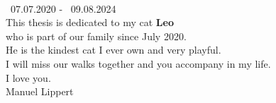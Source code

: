 \NewPage
\thispagestyle{empty}

\begin{center}
    \vspace*{3cm}
    \vspace{2cm}\\
    \gtrsymBorn~07.07.2020 - \gtrsymDied~09.08.2024 \\
    \bigskip
    This thesis is dedicated to my cat \textbf{Leo}\\ who is part of our family since July 2020.\\ He is the kindest cat I ever own and very playful.\\I will miss our walks together and you accompany in my life.\\ 
    \bigskip
    I love you.\\
    \bigskip
    Manuel Lippert\\
\end{center}